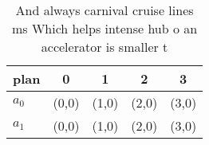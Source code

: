 \documentclass[a4paper]{article}
\begin{document}
\begin{table}
\begin{adjustbox}{width=0.5\columnwidth}
\begin{tabular}{|l|l|l|l|l|}
\hline
\textbf{plan} & \multicolumn{1}{c|}{\textbf{0}} & \multicolumn{1}{c|}{\textbf{1}} & \multicolumn{1}{c|}{\textbf{2}} & \multicolumn{1}{c|}{\textbf{3}} \\ \hline
\textbf{$a_0$}  & (0,0) & (1,0) & (2,0) & (3,0) \\ \hline
\textbf{$a_1$}  & (0,0) & (1,0) & (2,0) & (3,0) \\ \hline
\end{tabular}
\end{adjustbox}
\caption{And always carnival cruise lines ms Which helps intense hub o an accelerator is smaller t
}
\end{table}
\end{document}
